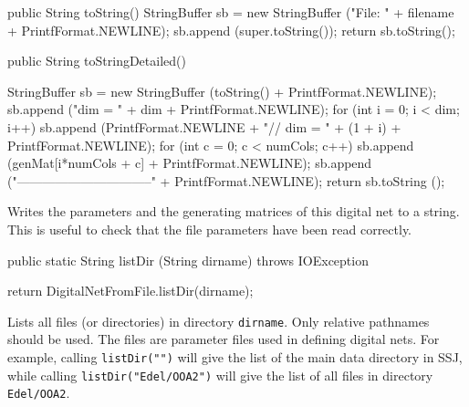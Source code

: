 \begin{code}\begin{hide}

   public String toString() {
      StringBuffer sb = new StringBuffer ("File:  " + filename  +
         PrintfFormat.NEWLINE);
      sb.append (super.toString());
      return sb.toString();
   }\end{hide}

   public String toStringDetailed() \begin{hide} {
      StringBuffer sb = new StringBuffer (toString() + PrintfFormat.NEWLINE);
      sb.append ("dim = " + dim + PrintfFormat.NEWLINE);
      for (int i = 0; i < dim; i++) {
         sb.append (PrintfFormat.NEWLINE + "// dim = " + (1 + i) +
              PrintfFormat.NEWLINE);
         for (int c = 0; c < numCols; c++)
            sb.append  (genMat[i*numCols + c]  + PrintfFormat.NEWLINE);
      }
      sb.append ("--------------------------------" + PrintfFormat.NEWLINE);
      return sb.toString ();
   }\end{hide}
\end{code}
\begin{tabb}
    Writes the parameters and the generating matrices of this digital net
    to a string.
    This is useful to check that the file parameters have been read correctly.
\end{tabb}
\begin{code}

   public static String listDir (String dirname) throws IOException \begin{hide} {
      return DigitalNetFromFile.listDir(dirname);
   }\end{hide}
\end{code}
\begin{tabb}
  Lists all files (or directories) in directory \texttt{dirname}. Only relative
  pathnames should be used. The files are  parameter files used in defining
  digital nets.  For example, calling \texttt{listDir("")} will give the list
  of the main data directory in SSJ, while calling \texttt{listDir("Edel/OOA2")}
  will give the list of all files in directory \texttt{Edel/OOA2}.
 \end{tabb}
\begin{code}
\begin{hide}
}
\end{hide}
\end{code}
